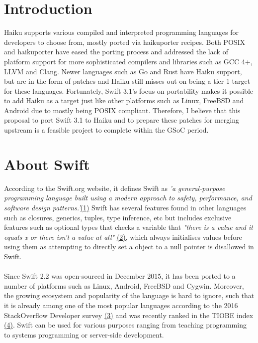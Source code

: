 \documentclass[12pt]{article}
\begin{document}
\section*{Introduction}
Haiku supports various compiled and interpreted programming languages for developers to choose from, mostly ported via haikuporter recipes. Both POSIX and haikuporter have eased the porting process and addressed the lack of platform support for more sophisticated compilers and libraries such as GCC 4+, LLVM and Clang. Newer languages such as Go and Rust have Haiku support, but are in the form of patches and Haiku still misses out on being a tier 1 target for these languages. Fortunately, Swift 3.1's focus on portability makes it possible to add Haiku as a target just like other platforms such as Linux, FreeBSD and Android due to mostly being POSIX compliant. Therefore, I believe that this proposal to port Swift 3.1 to Haiku and to prepare these patches for merging upstream is a feasible project to complete within the GSoC period.
\\
\section*{About Swift}
According to the Swift.org website, it defines Swift as \textit{'a general-purpose programming language built using a modern approach to safety, performance, and software design patterns.'}\hyperlink{(1)}{(1)} Swift has several features found in other languages such as closures, generics, tuples, type inference, etc but includes exclusive features such as optional types that checks a variable that \textit{"there is a value and it equals x or there isn't a value at all"} \hyperlink{(2)}{(2)}, which always initialises values before using them as attempting to directly set a object to a null pointer is disallowed in Swift.
\\
\\
Since Swift 2.2 was open-sourced in December 2015, it has been ported to a number of platforms such as Linux, Android, FreeBSD and Cygwin. Moreover, the growing ecosystem and popularity of the language is hard to ignore, such that it is already among one of the most popular languages according to the 2016 StackOverflow Developer survey \hyperlink{(3)}{(3)} and was recently ranked  in the TIOBE index \hyperlink{(4)}{(4)}. Swift can be used for various purposes ranging from teaching programming to systems programming or server-side development.
\end{document}
